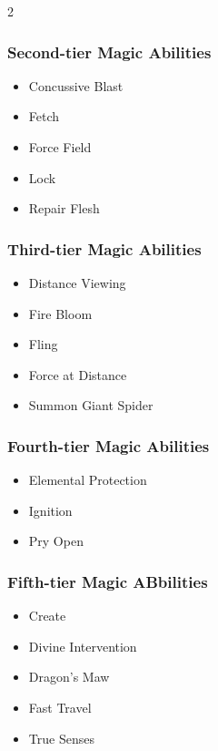 \begin{multicols}{2}
\subsubsection{Second-tier Magic Abilities}

\begin{itemize}
\item Concussive Blast
\item Fetch
\item Force Field 
\item Lock
\item Repair Flesh
\end{itemize}

\subsubsection{Third-tier Magic Abilities}

\begin{itemize}
\item Distance Viewing
\item Fire Bloom
\item Fling
\item Force at Distance
\item Summon Giant Spider
\end{itemize}

\subsubsection{Fourth-tier Magic Abilities}

\begin{itemize}
\item Elemental Protection
\item Ignition
\item Pry Open
\end{itemize}

\subsubsection{Fifth-tier Magic ABbilities}

\begin{itemize}
\item Create
\item Divine Intervention
\item Dragon’s Maw
\item Fast Travel
\item True Senses
\end{itemize}


\end{multicols}

